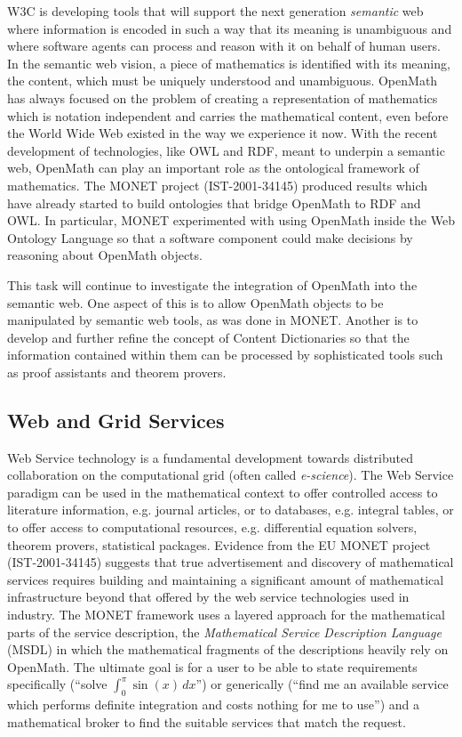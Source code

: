\documentclass{euproposal}
\begin{document}
W3C is developing tools that will support the next generation {\emph{semantic}}
web where information is encoded in such a way that its meaning is unambiguous and
where software agents can process and reason with it on behalf of human users.  In
the semantic web vision, a piece of mathematics is identified with its meaning,
the content, which must be uniquely understood and unambiguous.  OpenMath has
always focused on the problem of creating a representation of mathematics which is
notation independent and carries the mathematical content, even before the World
Wide Web existed in the way we experience it now. With the recent development of
technologies, like OWL and RDF, meant to underpin a semantic web, OpenMath can
play an important role as the ontological framework of mathematics. The MONET
project (IST-2001-34145) produced results which have already started to build
ontologies that bridge OpenMath to RDF and OWL.  In particular, MONET experimented
with using OpenMath inside the Web Ontology Language so that a software component
could make decisions by reasoning about OpenMath objects.

This task will continue to investigate the integration of OpenMath
into the semantic web.  One aspect of this is to allow OpenMath
objects to be manipulated by semantic web tools, as was done in MONET.
Another is to develop and further refine the concept of Content
Dictionaries so that the information contained within them can be
processed by sophisticated tools such as proof assistants and theorem
provers.

\subsection{Web and Grid Services}



Web Service technology is a fundamental development towards distributed
collaboration on the computational grid (often called {\emph{e-science}}).  The
Web Service paradigm can be used in the mathematical context to offer controlled
access to literature information, e.g. journal articles, or to databases, e.g.
integral tables, or to offer access to computational resources, e.g.  differential
equation solvers, theorem provers, statistical packages.  Evidence from the EU
MONET project (IST-2001-34145) suggests that true advertisement and discovery of
mathematical services requires building and maintaining a significant amount of
mathematical infrastructure beyond that offered by the web service technologies
used in industry.  The MONET framework uses a layered approach for the
mathematical parts of the service description, the \emph{Mathematical Service
  Description Language} (MSDL) in which the mathematical fragments of the
descriptions heavily rely on OpenMath.  The ultimate goal is for a user to be able
to state requirements specifically (``solve $\int_0^\pi{}\sin(x)\,dx$'') or
generically (``find me an available service which performs definite integration
and costs nothing for me to use'') and a mathematical broker to find the suitable
services that match the request.
\end{document}
